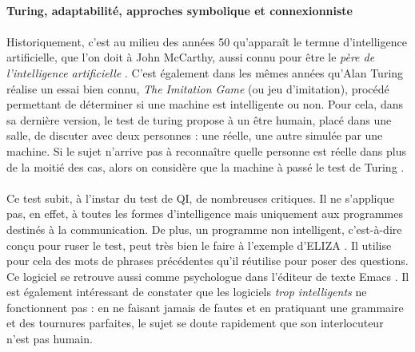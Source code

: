 \paragraph{Turing, adaptabilité, approches symbolique et connexionniste}

\paragraph{} Historiquement, c'est au milieu des années 50 qu'apparaît le termne d'intelligence artificielle, que l'on
doit à John McCarthy, aussi connu pour être le \emph{père de l'intelligence artificielle} \cite{AI2}. C'est également
dans les mêmes années qu'Alan Turing réalise un essai bien connu, \emph{The Imitation Game} (ou jeu d'imitation), procédé
permettant de déterminer si une machine est intelligente ou non. Pour cela, dans sa dernière version, le test de turing
propose à un être humain, placé dans une salle, de discuter avec deux personnes : une réelle, une autre simulée par une
machine. Si le sujet n'arrive pas à reconnaître quelle personne est réelle dans plus de la moitié des cas, alors on
considère que la machine à passé le test de Turing \cite{Turing0}.

\paragraph{} Ce test subit, à l'instar du test de QI, de nombreuses critiques. Il ne s'applique pas, en effet, à toutes
les formes d'intelligence mais uniquement aux programmes destinés à la communication. De plus, un programme \guillemotleft
non intelligent\guillemotright, c'est-à-dire conçu pour ruser le test, peut très bien le faire à l'exemple d'ELIZA \cite{Language0}.
Il utilise pour cela des mots de phrases précédentes qu'il réutilise pour poser des questions. Ce logiciel
se retrouve aussi comme psychologue dans l'éditeur de texte Emacs \cite{Therapy0}. Il est également intéressant de constater
que les logiciels \emph{trop intelligents} ne fonctionnent pas : en ne faisant jamais de fautes et en pratiquant une grammaire
et des tournures parfaites, le sujet se doute rapidement que son interlocuteur n'est pas humain.

